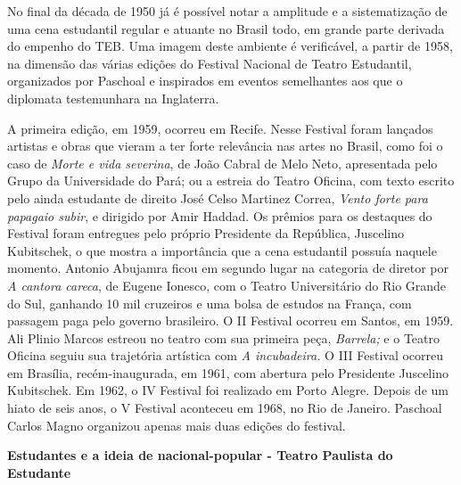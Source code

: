 No final da década de 1950 já é possível notar a amplitude e a
sistematização de uma cena estudantil regular e atuante no Brasil todo,
em grande parte derivada do empenho do TEB. Uma imagem deste ambiente é
verificável, a partir de 1958, na dimensão das várias edições do
Festival Nacional de Teatro Estudantil, organizados por Paschoal e
inspirados em eventos semelhantes aos que o diplomata testemunhara na
Inglaterra.

A primeira edição, em 1959, ocorreu em Recife. Nesse Festival foram
lançados artistas e obras que vieram a ter forte relevância nas artes no
Brasil, como foi o caso de \textit{Morte e vida severina}, de João Cabral
de Melo Neto, apresentada pelo Grupo da Universidade do Pará; ou a
estreia do Teatro Oficina, com texto escrito pelo ainda estudante de
direito José Celso Martinez Correa, \textit{Vento forte para papagaio
subir}, e dirigido por Amir Haddad. Os prêmios para os destaques do
Festival foram entregues pelo próprio Presidente da República, Juscelino
Kubitschek, o que mostra a importância que a cena estudantil possuía
naquele momento. Antonio Abujamra ficou em segundo lugar na categoria de
diretor por \textit{A cantora careca}, de Eugene Ionesco, com o Teatro
Universitário do Rio Grande do Sul, ganhando 10 mil cruzeiros e uma
bolsa de estudos na França, com passagem paga pelo governo brasileiro. O
II Festival ocorreu em Santos, em 1959. Ali Plinio Marcos estreou no
teatro com sua primeira peça, \textit{Barrela;} e o Teatro Oficina seguiu
sua trajetória artística com \textit{A incubadeira.} O III Festival ocorreu
em Brasília, recém-inaugurada, em 1961, com abertura pelo Presidente
Juscelino Kubitschek. Em 1962, o IV Festival foi realizado em Porto
Alegre. Depois de um hiato de seis anos, o V Festival aconteceu em 1968,
no Rio de Janeiro. Paschoal Carlos Magno organizou apenas mais duas
edições do festival.

\textbf{Estudantes e a ideia de nacional-popular - Teatro Paulista do
Estudante}

